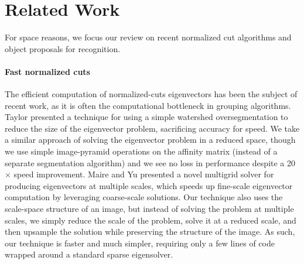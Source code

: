\documentclass[10pt,journal,cspaper,compsoc]{IEEEtran}
\newcommand*{\etal}{\textit{et al.}\ }
\begin{document}

\section{Related Work}
\label{sec:related_work}

For space reasons, we focus our review on recent normalized cut algorithms and object proposals for recognition.

\paragraph*{\textbf{Fast normalized cuts}} The efficient computation of normalized-cuts eigenvectors has been the subject of recent work, as it is often the computational bottleneck in grouping algorithms. 
Taylor \cite{TaylorCVPR13} presented a technique for using a simple watershed oversegmentation to reduce the size of the eigenvector problem, sacrificing accuracy for speed. 
We take a similar approach of solving the eigenvector problem in a reduced space, though we use simple image-pyramid operations on the affinity matrix (instead of a separate segmentation algorithm) and we see no loss in performance despite a 20$\times$ speed improvement. 
Maire and Yu \cite{MaireICCV2013} presented a novel multigrid solver for producing eigenvectors at multiple scales, which speeds up fine-scale eigenvector computation by leveraging coarse-scale solutions. 
Our technique also uses the scale-space structure of an image, but instead of solving the problem at multiple scales, we simply reduce the scale of the problem, solve it at a reduced scale, and then upsample the solution while preserving the structure of the image. 
As such, our technique is faster and much simpler, requiring only a few lines of code wrapped around a standard sparse eigensolver.
\end{document}
